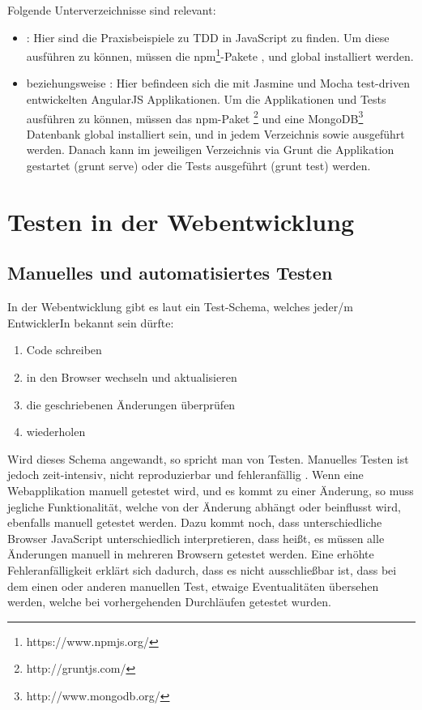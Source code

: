 Folgende Unterverzeichnisse sind relevant:
\begin{itemize}
  \item {}: Hier sind die Praxisbeispiele zu TDD in JavaScript zu finden. Um diese ausführen zu können, müssen die npm\footnote{https://www.npmjs.org/}-Pakete ,  und  global installiert werden.
  \item {} beziehungsweise : Hier befindeen sich die mit Jasmine und Mocha test-driven entwickelten AngularJS Applikationen. Um die Applikationen und Tests ausführen zu können, müssen das npm-Paket \footnote{http://gruntjs.com/} und eine MongoDB\footnote{http://www.mongodb.org/} Datenbank global installiert sein, und in jedem Verzeichnis  sowie  ausgeführt werden. Danach kann im jeweiligen Verzeichnis via Grunt die Applikation gestartet (grunt serve) oder die Tests ausgeführt (grunt test) werden.
\end{itemize}

\newpage

\section{Testen in der Webentwicklung}
\subsection{Manuelles und automatisiertes Testen}
In der Webentwicklung gibt es laut \cite[3]{Johansen:2011} ein Test-Schema, welches jeder/m EntwicklerIn bekannt sein dürfte:
\begin{enumerate}
  \item Code schreiben
  \item in den Browser wechseln und aktualisieren
  \item die geschriebenen Änderungen überprüfen
  \item wiederholen
\end{enumerate}
Wird dieses Schema angewandt, so spricht man von  Testen. Manuelles Testen ist jedoch zeit-intensiv, nicht reproduzierbar und fehleranfällig \autocite[3]{Johansen:2011}. Wenn eine Webapplikation manuell getestet wird, und es kommt zu einer Änderung, so muss jegliche Funktionalität, welche von der Änderung abhängt oder beinflusst wird, ebenfalls manuell getestet werden. Dazu kommt noch, dass unterschiedliche Browser JavaScript unterschiedlich interpretieren, dass heißt, es müssen alle Änderungen manuell in mehreren Browsern getestet werden. Eine erhöhte Fehleranfälligkeit erklärt sich dadurch, dass es nicht ausschließbar ist, dass bei dem einen oder anderen manuellen Test, etwaige Eventualitäten übersehen werden, welche bei vorhergehenden Durchläufen getestet wurden.

